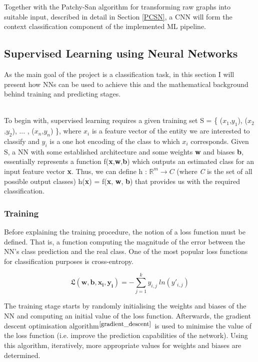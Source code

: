 Together with the Patchy-San algorithm for transforming raw graphs into suitable input, described in detail in Section \ref{PCSN}, a CNN will form the context classification component of the implemented ML pipeline. \\

\subsection{Supervised Learning using Neural Networks}

As the main goal of the project is a classification task, in this section I will present how NNs can be used to achieve this and the mathematical background behind training and predicting stages. \\\

To begin with, supervised learning requires a given training set S = \{ ($x_1$,$y_1$), ($x_2$,$y_2$), ... , ($x_n$,$y_n$) \}, where \textbf{$x_i$} is a feature vector of the entity we are interested to classify and \textbf{$y_i$} is a one hot encoding of the class to which \textbf{$x_i$} corresponds. Given S, a NN with some established architecture and some weights \textbf{w} and biases \textbf{b}, essentially represents a function f(\textbf{x},\textbf{w},\textbf{b}) which outputs an estimated class for an input feature vector \textbf{x}. Thus, we can define h : $\mathbb{R}^m \rightarrow \textit{C}$ (where \textit{C} is the set of all possible output classes) h(\textbf{x}) = f(\textbf{x}, \textbf{w}, \textbf{b}) that provides us with the required classification.

\subsubsection*{Training}

Before explaining the training procedure, the notion of a loss function must be defined. That is, a function computing the magnitude of the error between the NN's class prediction and the real class. One of the most popular loss functions for classification purposes is cross-entropy.

\begin{equation}
  \mathbf{\mathfrak{L}}(\mathbf{w}, \mathbf{b}, \mathbf{x_i}, \mathbf{y_i}) = - \sum_{j=1}^k y_{i,j} \ ln(y'_{i,j})
\end{equation}

The training stage starts by randomly initialising the weights and biases of the NN and computing an initial value of the loss function. Afterwards, the gradient descent optimisation algorithm$^{\small \cite{gradient_descent}}$ is used to minimise the value of the loss function (i.e. improve the prediction capabilities of the network). Using this algorithm, iteratively, more appropriate values for weights and biases are determined. 

